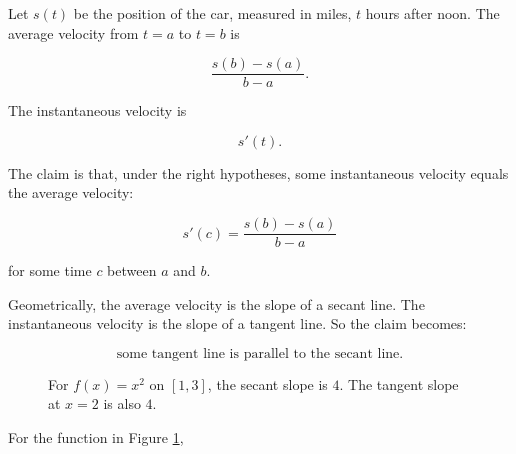 Let \(s(t)\) be the position of the car, measured in miles, \(t\) hours after noon.
The average velocity from \(t=a\) to \(t=b\) is

\[
\frac{s(b)-s(a)}{b-a}.
\]

The instantaneous velocity is

\[
s'(t).
\]

The claim is that, under the right hypotheses, some instantaneous velocity equals the
average velocity:

\[
s'(c)=\frac{s(b)-s(a)}{b-a}
\]

for some time \(c\) between \(a\) and \(b\).

Geometrically, the average velocity is the slope of a secant line.  The instantaneous
velocity is the slope of a tangent line.  So the claim becomes:

\[
\text{some tangent line is parallel to the secant line.}
\]

\begin{figure}[h]
\centering
{}
\caption{For \(f(x)=x^2\) on \([1,3]\), the secant slope is \(4\).  The tangent slope at \(x=2\) is also \(4\).}
\label{fig:mvt-parabola}
\end{figure}

For the function in Figure \ref{fig:mvt-parabola},

